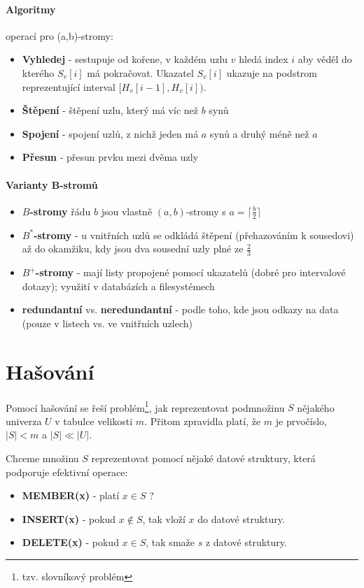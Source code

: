 \documentclass[a4paper]{article}      %
\begin{document}
\paragraph{Algoritmy} operací pro (a,b)-stromy:
\begin{itemize}
	\item \textbf{Vyhledej} - sestupuje od kořene, v každém uzlu $v$ hledá index $i$ aby věděl do kterého $S_{v}[i]$
        má pokračovat. Ukazatel $S_{v}[i]$ ukazuje na podstrom reprezentující interval $[H_{v}[i-1],H_{v}[i])$.
	\item \textbf{Štěpení} - štěpení uzlu, který má víc než $b$ synů
	\item \textbf{Spojení} - spojení uzlů, z nichž jeden má $a$ synů a druhý méně než $a$
	\item \textbf{Přesun} - přesun prvku mezi dvěma uzly
\end{itemize}

\paragraph{Varianty B-stromů}
\begin{itemize}
\item \textbf{$B$-stromy} řádu $b$ jsou vlastně $(a,b)$-stromy s $a=\lceil \frac{b}{2}\rceil$
\item \textbf{$B^{*}$-stromy} - u vnitřních uzlů se odkládá štěpení (přehazováním k sousedovi) až do okamžiku,
kdy jsou dva sousední uzly plné ze $\frac{2}{3}$
\item \textbf{$B^{+}$-stromy} - mají listy propojené pomocí ukazatelů (dobré pro intervalové dotazy); využití v databázích a filesystémech
\item \textbf{redundantní} vs. \textbf{neredundantní} - podle toho, kde jsou odkazy na data (pouze v listech vs. ve vnitřních uzlech)
\end{itemize}

\section{Hašování}
Pomocí hašování se řeší problém\footnote{tzv. slovníkový problém}, jak reprezentovat podmnožinu $S$ nějakého univerza $U$ v tabulce velikosti $m$.
Přitom zpravidla platí, že $m$ je prvočíslo, $|S| < m $ a $|S| \ll |U|$.

Chceme množinu $S$ reprezentovat pomocí nějaké datové struktury, která podporuje efektivní operace:
\begin{itemize}
\item \textbf{MEMBER(x)} - platí $x \in S$ ?
\item \textbf{INSERT(x)} - pokud $x \notin S$, tak vloží $x$ do datové struktury. 
\item \textbf{DELETE(x)} - pokud $x \in S$, tak smaže $s$ z datové struktury.
\end{itemize}  
\end{document}
